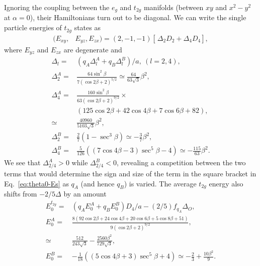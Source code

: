 \documentclass[a4paper,prb]{revtex4-1}  %
\newcommand{\rev}[1]{{\color{blue}{#1}}}
\begin{document}
Ignoring the coupling between the $e_{g}$ and $t_{2g}$ manifolds (between $xy$ and $x^2-y^2$ at $\alpha=0$),
their Hamiltonians turn out to be diagonal.
We can write the single particle energies of $t_{2g}$ states
as
\begin{align}
\label{eq:theta0-Es}
(E_{xy},&E_{yz},E_{zx})= (2, -1, -1)
\left[\frac{}{} \Delta_{2}  D_2 + \Delta_4 D_4\right],
 \end{align}
 where $E_{yz}$ and $E_{zx}$ are degenerate and 
\begin{align}
\Delta_{l} =&  \left(q_A \Delta_{l}^A + q_B\Delta_{l}^B\right)/a,~(l=2,4),\\
\Delta_{2}^A =& 
\frac{64 \sin ^2\beta }{7 (\cos 2 \beta +2)^{5/2}} %
 \simeq \frac{64}{63 \sqrt{3}}\beta ^2,\\
\Delta_4^A =&
 \frac{160 \sin ^2\beta}{63 (\cos 2\beta+2)^{9/2}} \times \\
&  (125 \cos 2\beta+42 \cos 4\beta+7 \cos 6\beta+82),\\
\simeq& \frac{40960}{5103 \sqrt{3}}\beta ^2,\\
 \label{eq:theta0-delB2}
\Delta_{2}^B =& \frac{2}{7} \left(1-\sec ^3\beta\right)
\simeq -\frac{3}{7}\beta ^2,\\
\label{eq:theta0-delB4}
  \Delta_4^B =&\frac{5}{126} \left((7 \cos 4\beta-3) \sec ^5\beta-4\right)
  \simeq -\frac{115}{63}\beta ^2.
 \end{align}
 We see that $\Delta_{2/4}^A>0$ while $\Delta_{2/4}^B<0$,
 revealing a competition between the two terms 
 that would determine the sign and size of the term
  in the square bracket in Eq.~\ref{eq:theta0-Es} 
  as $q_A$ (and hence $q_B$)
  is varied.
The average $t_{2g}$ energy
 also shifts from
$-2/5\Delta$ by an amount
\begin{align}
\label{eq:theta0-E0}
E_{0}^{t_{2g}} =& \left(q_A E_{0}^A + q_BE_{0}^B\right)D_4/a
-(2/5)f_{q_A}\Delta_{O},\\
E_{0}^A =&
 \frac{8 (92 \cos 2\beta+24 \cos 4\beta+20 \cos 6\beta+5 \cos 8\beta+51)}{9 (\cos 2\beta+2)^{9/2}},\\
 \simeq& \frac{512}{243 \sqrt{3}}-\frac{2560 \beta ^2}{729 \sqrt{3}},\\
E_{0}^B=&
 -\frac{1}{18} \left((5 \cos 4\beta+3) \sec ^5\beta+4\right)
 \simeq -\frac{2}{3}+\frac{10 \beta ^2}{9}.
 \end{align}
 
\end{document}

